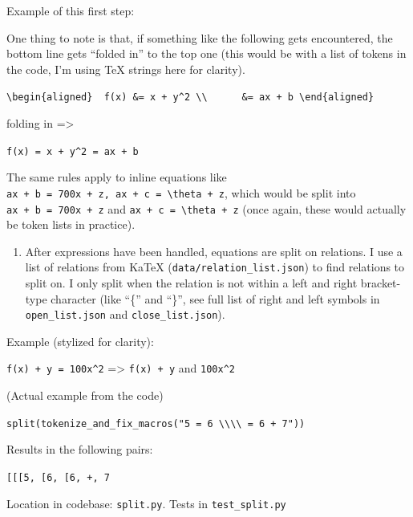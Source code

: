 \documentclass[]{article}
\providecommand{\tightlist}{%
  \setlength{\itemsep}{0pt}\setlength{\parskip}{0pt}}
\begin{document}
Example of this first step:

One thing to note is that, if something like the following gets
encountered, the bottom line gets ``folded in'' to the top one (this
would be with a list of tokens in the code, I'm using TeX strings here
for clarity).

\texttt{\textbackslash{}begin\{aligned\}\ \ f(x)\ \&=\ x\ +\ y\^{}2\ \textbackslash{}\textbackslash{}\ \ \ \ \ \ \&=\ ax\ +\ b\ \textbackslash{}end\{aligned\}}

folding in =\textgreater{}

\texttt{f(x)\ =\ x\ +\ y\^{}2\ =\ ax\ +\ b}

The same rules apply to inline equations like
\texttt{ax\ +\ b\ =\ 700x\ +\ z,\ ax\ +\ c\ =\ \textbackslash{}theta\ +\ z},
which would be split into \texttt{ax\ +\ b\ =\ 700x\ +\ z} and
\texttt{ax\ +\ c\ =\ \textbackslash{}theta\ +\ z} (once again, these
would actually be token lists in practice).

\begin{enumerate}
\def\labelenumi{\arabic{enumi}.}
\setcounter{enumi}{1}
\tightlist
\item
  After expressions have been handled, equations are split on relations.
  I use a list of relations from KaTeX
  (\texttt{data/relation\_list.json}) to find relations to split on. I
  only split when the relation is not within a left and right
  bracket-type character (like ``\{'' and ``\}'', see full list of right
  and left symbols in \texttt{open\_list.json} and
  \texttt{close\_list.json}).
\end{enumerate}

Example (stylized for clarity):

\texttt{f(x)\ +\ y\ =\ 100x\^{}2} =\textgreater{} \texttt{f(x)\ +\ y}
and \texttt{100x\^{}2}

(Actual example from the code)

\texttt{split(tokenize\_and\_fix\_macros("5\ =\ 6\ \textbackslash{}\textbackslash{}\textbackslash{}\textbackslash{}\ =\ 6\ +\ 7"))}

Results in the following pairs:

\texttt{{[}{[}{[}\textquotesingle{}5\textquotesingle{}{]},\ {[}\textquotesingle{}6\textquotesingle{}{]},\ {[}\textquotesingle{}6\textquotesingle{},\ \textquotesingle{}+\textquotesingle{},\ \textquotesingle{}7\textquotesingle{}{]}{]}{]}}

Location in codebase: \texttt{split.py}. Tests in
\texttt{test\_split.py}
\end{document}
